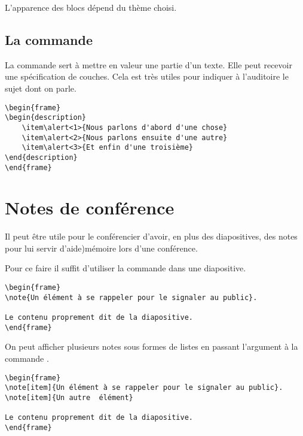 L'apparence des blocs dépend du thème choisi.

\subsection{La commande }

La commande  sert à mettre en valeur une partie d'un texte. Elle peut recevoir une spécification de couches. Cela est très utiles pour indiquer à l'auditoire le sujet dont on parle. 

\begin{verbatim}
\begin{frame}
\begin{description}
	\item\alert<1>{Nous parlons d'abord d'une chose}
	\item\alert<2>{Nous parlons ensuite d'une autre}
	\item\alert<3>{Et enfin d'une troisième}
\end{description}
\end{frame}
\end{verbatim}

\section{Notes de conférence}

Il peut être utile pour le conférencier d'avoir, en plus des diapositives, des notes pour lui servir d'aide)mémoire lors d'une conférence.

Pour ce faire il suffit d'utiliser la commande  dans une diapositive.

\begin{verbatim}
\begin{frame}
\note{Un élément à se rappeler pour le signaler au public}.
	
Le contenu proprement dit de la diapositive.
\end{frame}
\end{verbatim}

On peut afficher plusieurs notes sous formes de listes en passant l'argument  à la commande .

\begin{verbatim}
\begin{frame}
\note[item]{Un élément à se rappeler pour le signaler au public}.
\note[item]{Un autre  élément}
	
Le contenu proprement dit de la diapositive.
\end{frame}
\end{verbatim}


